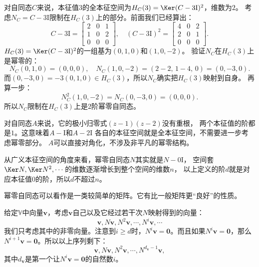 \documentclass[12pt,UTF8,fontset=none]{ctexbook}
\begin{document}
对自同态$C$来说，本征值$3$的全本征空间为$H_C(3) = \Ker(C-3\mathrm{I})^2$，维数为$2$。
考虑$N_C = C - 3\mathrm{I}$限制在$H_C(3)$上的部分。前面我们已经算出：
$$
C - 3\mathrm{I} = \begin{bmatrix} 2 & 0 & 1 \\ 1 & 0 & 2 \\ 0 & 0 & 0 \end{bmatrix}, \quad (C-3\mathrm{I})^2 = \begin{bmatrix} 4 & 0 & 2 \\ 2 & 0 & 1 \\ 0 & 0 & 0 \end{bmatrix}.
$$
$H_C(3) = \Ker(C-3\mathrm{I})^2$的一组基为$(0,1,0)$和$(1,0,-2)$。
验证$N_C$在$H_C(3)$上是幂零的：
$$
N_C(0,1,0) = (0, 0, 0), \quad N_C(1,0,-2) = (2-2,\, 1-4,\, 0) = (0,-3,0).
$$
而$(0,-3,0) = -3(0,1,0) \in H_C(3)$，所以$N_C$确实把$H_C(3)$映射到自身。
再算一步：
$$
N_C^2(1,0,-2) = N_C(0,-3,0) = (0, 0, 0).
$$
所以$N_C$限制在$H_C(3)$上是$2$阶幂零自同态。

对自同态$A$来说，它的极小归零式$(z-1)(z-2)$没有重根，
两个本征值的阶都是$1$。这意味着$A - \mathrm{I}$和$A - 2\mathrm{I}$
各自的本征空间就是全本征空间，不需要进一步考虑幂零部分。
$A$可以直接对角化，不涉及非平凡的幂零结构。

从广义本征空间的角度来看，幂零自同态$N$其实就是$N - 0\mathrm{I}$，
空间套$\Ker N, \Ker N^2, \cdots$的维数逐渐增长到整个空间的维数$n$，
以上定义的阶$d$就是对应本征值$0$的阶，所以$d$不超过$n$。

幂零自同态可以看作是一类较简单的矩阵。它有比一般矩阵更“良好”的性质。

给定$\mathbb{V}$中向量$\mathbf{v}$，考虑$\mathbf{v}$自己以及它经过若干次$N$映射得到的向量：
$$ \mathbf{v}, N\mathbf{v}, N^2 \mathbf{v}, \cdots , N^i \mathbf{v} ,\cdots $$
我们只考虑其中的非零向量。注意到$i \geqslant d$时，$N^i \mathbf{v} = \mathbf{0}$。而且如果$N^i \mathbf{v} = \mathbf{0}$，那么$N^{i+1} \mathbf{v} = \mathbf{0}$。所以以上序列剩下：
$$ \mathbf{v}, N\mathbf{v}, N^2 \mathbf{v}, \cdots , N^{d_\mathbf{v} - 1} \mathbf{v}, $$
其中$d_\mathbf{v}$是第一个让$N^i \mathbf{v} = \mathbf{0}$的自然数$i$。
\end{document}
